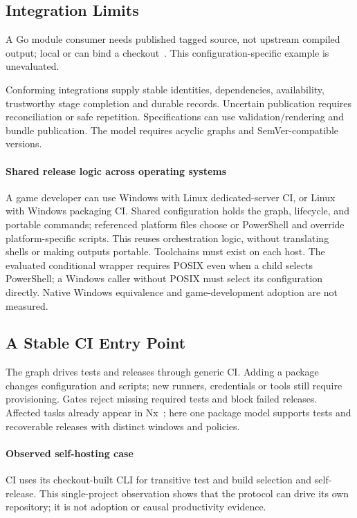 \subsection{Integration Limits}

A Go module consumer needs published tagged source, not upstream compiled
output; local  or  can bind a checkout~\cite{gomod}.
This configuration-specific example is unevaluated.

Conforming integrations supply stable identities, dependencies, availability,
trustworthy stage completion and durable records. Uncertain publication requires
reconciliation or safe repetition. Specifications can use validation/rendering
and bundle publication. The model requires acyclic graphs and SemVer-compatible
versions.

\paragraph{Shared release logic across operating systems}
A game developer can use Windows with Linux dedicated-server CI, or Linux
with Windows packaging CI. Shared configuration holds the graph, lifecycle,
and portable commands; referenced platform files choose  or PowerShell
and override platform-specific scripts. This reuses orchestration logic,
without translating shells or making outputs portable. Toolchains must exist
on each host. The evaluated conditional wrapper requires POSIX even when a
child selects PowerShell; a Windows caller without POSIX must select its
configuration directly. Native Windows equivalence and game-development
adoption are not measured.

\subsection{A Stable CI Entry Point}
The graph drives tests and releases through generic CI. Adding a package changes
configuration and scripts; new runners, credentials or tools still require
provisioning. Gates reject missing required tests and block failed releases.
Affected tasks already appear in Nx~\cite{nx}; here one package model supports
tests and recoverable releases with distinct windows and policies.

\paragraph{Observed self-hosting case}
CI uses its checkout-built CLI for transitive test and build selection and
self-release. This single-project observation shows that the protocol can drive
its own repository; it is not adoption or causal productivity evidence.

